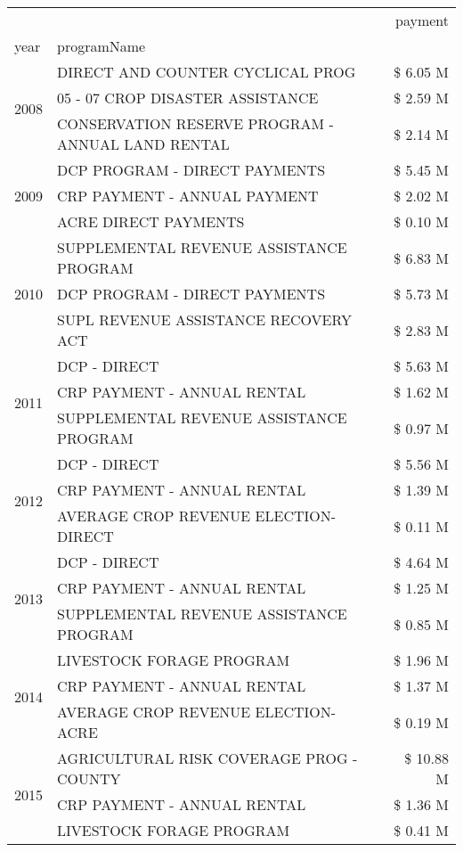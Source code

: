 \begin{tabular}{llr}
\toprule
 &  & payment \\
year & programName &  \\
\midrule
\multirow[t]{3}{*}{2008} & DIRECT AND COUNTER CYCLICAL PROG & \$ 6.05 M \\
 & 05 - 07 CROP DISASTER ASSISTANCE & \$ 2.59 M \\
 & CONSERVATION RESERVE PROGRAM - ANNUAL LAND RENTAL & \$ 2.14 M \\
\cline{1-3}
\multirow[t]{3}{*}{2009} & DCP PROGRAM - DIRECT PAYMENTS & \$ 5.45 M \\
 & CRP PAYMENT - ANNUAL PAYMENT & \$ 2.02 M \\
 & ACRE DIRECT PAYMENTS & \$ 0.10 M \\
\cline{1-3}
\multirow[t]{3}{*}{2010} & SUPPLEMENTAL REVENUE ASSISTANCE PROGRAM & \$ 6.83 M \\
 & DCP PROGRAM - DIRECT PAYMENTS & \$ 5.73 M \\
 & SUPL REVENUE ASSISTANCE RECOVERY ACT & \$ 2.83 M \\
\cline{1-3}
\multirow[t]{3}{*}{2011} & DCP - DIRECT & \$ 5.63 M \\
 & CRP PAYMENT - ANNUAL RENTAL & \$ 1.62 M \\
 & SUPPLEMENTAL REVENUE ASSISTANCE PROGRAM & \$ 0.97 M \\
\cline{1-3}
\multirow[t]{3}{*}{2012} & DCP - DIRECT & \$ 5.56 M \\
 & CRP PAYMENT - ANNUAL RENTAL & \$ 1.39 M \\
 & AVERAGE CROP REVENUE ELECTION-DIRECT & \$ 0.11 M \\
\cline{1-3}
\multirow[t]{3}{*}{2013} & DCP - DIRECT & \$ 4.64 M \\
 & CRP PAYMENT - ANNUAL RENTAL & \$ 1.25 M \\
 & SUPPLEMENTAL REVENUE ASSISTANCE PROGRAM & \$ 0.85 M \\
\cline{1-3}
\multirow[t]{3}{*}{2014} & LIVESTOCK FORAGE PROGRAM & \$ 1.96 M \\
 & CRP PAYMENT - ANNUAL RENTAL & \$ 1.37 M \\
 & AVERAGE CROP REVENUE ELECTION-ACRE & \$ 0.19 M \\
\cline{1-3}
\multirow[t]{3}{*}{2015} & AGRICULTURAL RISK COVERAGE PROG - COUNTY & \$ 10.88 M \\
 & CRP PAYMENT - ANNUAL RENTAL & \$ 1.36 M \\
 & LIVESTOCK FORAGE PROGRAM & \$ 0.41 M \\
\cline{1-3}

\end{tabular}
